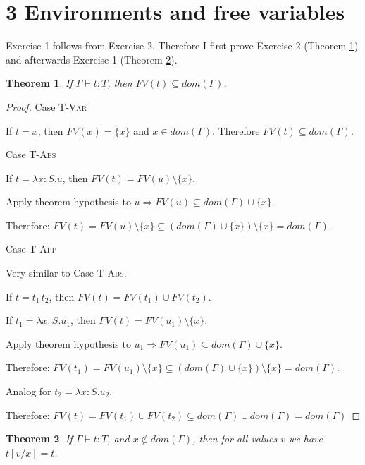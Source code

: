 \documentclass[13pt, a4paper]{article}
\newtheorem{theorem}{Theorem}
\begin{document}
\section*{3 Environments and free variables}

Exercise 1 follows from Exercise 2. Therefore I first prove Exercise 2 (Theorem \ref{thm:3-2}) and afterwards Exercise 1 (Theorem \ref{thm:3-1}).

\begin{theorem}\label{thm:3-2}
If $\Gamma \vdash t: T$, then $FV(t) \subseteq dom(\Gamma)$.
\end{theorem}

\begin{proof}

\noindent Case \textsc{T-Var}

If $t=x$, then $FV(x) = \{x\}$ and $x \in dom(\Gamma)$. Therefore $FV(t) \subseteq dom(\Gamma)$.

\noindent Case \textsc{T-Abs}

If $t=\lambda x : S. u$, then $FV(t) = FV(u) \setminus \{x\}$.

Apply theorem hypothesis to $u \Rightarrow FV(u) \subseteq dom(\Gamma) \cup \{x\}$.

Therefore: $FV(t) = FV(u) \setminus \{x\} \subseteq (dom(\Gamma) \cup \{x\}) \setminus \{x\} = dom(\Gamma)$.

\noindent Case \textsc{T-App}

Very similar to Case \textsc{T-Abs}.

If $t= t_1\,t_2$, then $FV(t) = FV(t_1) \cup FV(t_2)$.

If $t_1=\lambda x : S. u_1$, then $FV(t) = FV(u_1) \setminus \{x\}$.

Apply theorem hypothesis to $u_1 \Rightarrow FV(u_1) \subseteq dom(\Gamma) \cup \{x\}$.

Therefore: $FV(t_1) = FV(u_1) \setminus \{x\} \subseteq (dom(\Gamma) \cup \{x\}) \setminus \{x\} = dom(\Gamma)$.

Analog for $t_2=\lambda x : S. u_2$.

Therefore: $FV(t) = FV(t_1) \cup FV(t_2) \subseteq dom(\Gamma) \cup dom(\Gamma) = dom(\Gamma)$

\end{proof}


\begin{theorem}\label{thm:3-1}
If $\Gamma \vdash t: T$, and $x \notin dom(\Gamma)$, then for all values $v$ we have $t[v/x]=t$.
\end{theorem}
\end{document}
